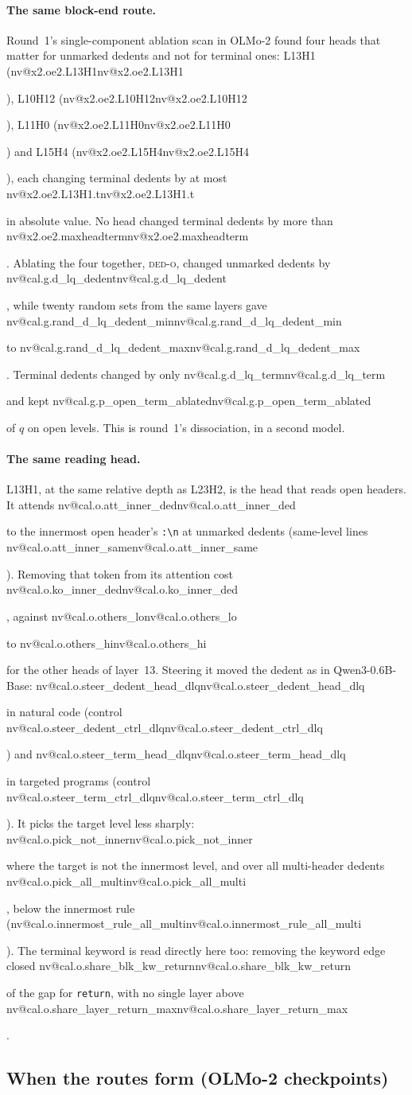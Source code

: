 \documentclass[11pt]{article}
\makeatletter
\newcommand{\nv}[1]{\ifcsname nv@#1\endcsname\csname nv@#1\endcsname\else\PackageError{numbers}{Unknown number key #1}{}\fi}
\newcommand{\qw}{Qwen3-0.6B-Base}
\newcommand{\hd}[2]{L#1H#2}
\newcommand{\code}[1]{\texttt{#1}}
\makeatother
\begin{document}
\paragraph{The same block-end route.} Round~1's single-component ablation scan in OLMo-2 found four heads that matter for unmarked dedents and not for terminal ones: \hd{13}{1} (\nv{x2.oe2.L13H1}), \hd{10}{12} (\nv{x2.oe2.L10H12}), \hd{11}{0} (\nv{x2.oe2.L11H0}) and \hd{15}{4} (\nv{x2.oe2.L15H4}), each changing terminal dedents by at most \nv{x2.oe2.L13H1.t} in absolute value. No head changed terminal dedents by more than \nv{x2.oe2.maxheadterm}. Ablating the four together, \textsc{ded-o}, changed unmarked dedents by \nv{cal.g.d_lq_dedent}, while twenty random sets from the same layers gave \nv{cal.g.rand_d_lq_dedent_min} to \nv{cal.g.rand_d_lq_dedent_max}. Terminal dedents changed by only \nv{cal.g.d_lq_term} and kept \nv{cal.g.p_open_term_ablated} of $q$ on open levels. This is round~1's dissociation, in a second model.

\paragraph{The same reading head.} \hd{13}{1}, at the same relative depth as \hd{23}{2}, is the head that reads open headers. It attends \nv{cal.o.att_inner_ded} to the innermost open header's \code{:\textbackslash n} at unmarked dedents (same-level lines \nv{cal.o.att_inner_same}). Removing that token from its attention cost \nv{cal.o.ko_inner_ded}, against \nv{cal.o.others_lo} to \nv{cal.o.others_hi} for the other heads of layer~13. Steering it moved the dedent as in \qw{}: \nv{cal.o.steer_dedent_head_dlq} in natural code (control \nv{cal.o.steer_dedent_ctrl_dlq}) and \nv{cal.o.steer_term_head_dlq} in targeted programs (control \nv{cal.o.steer_term_ctrl_dlq}). It picks the target level less sharply: \nv{cal.o.pick_not_inner} where the target is not the innermost level, and over all multi-header dedents \nv{cal.o.pick_all_multi}, below the innermost rule (\nv{cal.o.innermost_rule_all_multi}). The terminal keyword is read directly here too: removing the keyword edge closed \nv{cal.o.share_blk_kw_return} of the gap for \code{return}, with no single layer above \nv{cal.o.share_layer_return_max}.

\subsection{When the routes form (OLMo-2 checkpoints)}
\label{sec:ckpt}
\end{document}
